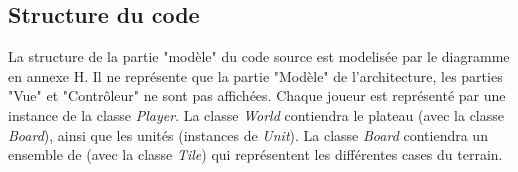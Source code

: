 \subsection{Structure du code}

La structure de la partie "modèle" du code source est modelisée par le diagramme en annexe H. Il ne représente que la partie "Modèle" de l'architecture, les parties "Vue" et "Contrôleur" ne sont pas affichées.
Chaque joueur est représenté par une instance de la classe \emph{Player}.
La classe \emph{World} contiendra le plateau (avec la classe \emph{Board}), ainsi que les unités (instances de \emph{Unit}).
La classe \emph{Board} contiendra un ensemble de (avec la classe \emph{Tile}) qui représentent les différentes cases du terrain.


